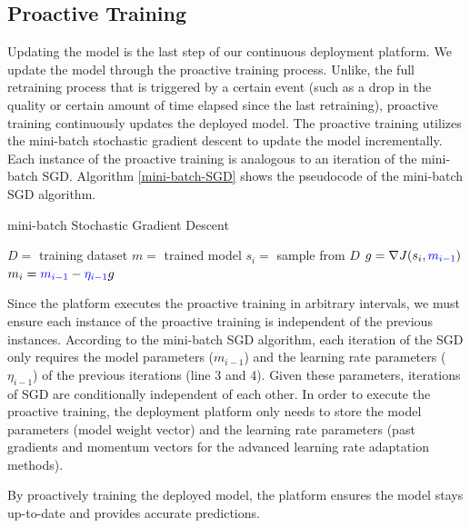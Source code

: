 \subsection{Proactive Training}\label{proactive-training}
Updating the model is the last step of our continuous deployment platform.
We update the model through the proactive training process.
Unlike, the full retraining process that is triggered by a certain event (such as a drop in the quality or certain amount of time elapsed since the last retraining), proactive training continuously updates the deployed model.
The proactive training utilizes the mini-batch stochastic gradient descent to update the model incrementally.
Each instance of the proactive training is analogous to an iteration of the mini-batch SGD.
Algorithm \ref{mini-batch-SGD} shows the pseudocode of the mini-batch SGD algorithm.
\begin{algorithm}
\caption{mini-batch Stochastic Gradient Descent}\label{mini-batch-SGD}
\begin{algorithmic}[1]
\Require  $D=$ training dataset
\Ensure $m=$ trained model
	\State $s_i =$ sample from $D$
	\State $g = \nabla J(s_i, \textcolor{blue}{m_{i-1}})$
	\State $m_i = \textcolor{blue}{m_{i-1}} - \textcolor{blue}{\eta_{i-1}}g$
\EndFor
\end{algorithmic}
\end{algorithm}

Since the platform executes the proactive training in arbitrary intervals, we must ensure each instance of the proactive training is independent of the previous instances.
According to the mini-batch SGD algorithm, each iteration of the SGD only requires the model parameters ($m_{i-1}$) and the learning rate parameters ($\eta_{i-1}$) of the previous iterations (line 3 and 4).
Given these parameters, iterations of SGD are conditionally independent of each other.
In order to execute the proactive training, the deployment platform only needs to store the model parameters (model weight vector) and the learning rate parameters (past gradients and momentum vectors for the advanced learning rate adaptation methods).

By proactively training the deployed model, the platform ensures the model stays up-to-date and provides accurate predictions.


